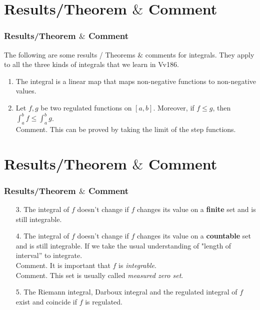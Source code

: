 \documentclass[12pt, t]{beamer}
\renewcommand{\emph}[1]{{\color{Turquoise3}\textsl{#1}}}
\begin{document}
\section{Results/Theorem $\&$ Comment}
\begin{frame}
    \frametitle{Results/Theorem $\&$ Comment}
\hspace{2em}
The following are some results / Theorems $\&$ comments for integrals. They apply to all the three kinds of integrals that we learn in Vv186.

\begin{enumerate}
    \item The integral is a linear map that maps non-negative functions to non-negative values.\\
    \vspace{1em}
    \item Let $f,g$ be two regulated functions on $[a,b]$. Moreover, if $f\leq g$, then $\int_a^bf\leq\int_a^bg$.\\
        \footnotesize Comment. This can be proved by taking the limit of the step functions.
\end{enumerate}

\end{frame}

\section{Results/Theorem $\&$ Comment}
\begin{frame}
    \frametitle{Results/Theorem $\&$ Comment}
\begin{enumerate}
    \item[3.] The integral of $f$ doesn't change if $f$ changes its value on a \textbf{finite} set and is still integrable.\\
    \vspace{1em}
    \item[4.] The integral of $f$ doesn't change if $f$ changes its value on a \textbf{countable} set and is still integrable. If we take the usual understanding of "length of interval'' to integrate.\\
    \footnotesize Comment. It is important that $f$ is \emph{integrable}.\\
    \footnotesize Comment. This set is usually called \emph{measured zero set}.\\
    \vspace{1em}
    \item[5.] The Riemann integral, Darboux integral and the regulated integral of $f$ exist and coincide if $f$ is regulated.
\end{enumerate}
\end{frame}
\end{document}
